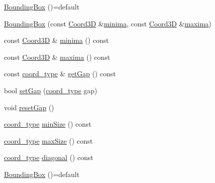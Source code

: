 \begin{DoxyCompactItemize}
\item 
\hyperlink{classMcCAD_1_1Geometry_1_1BoundingBox_aa9d7c831f4053d6eff0e2c484a2a0c92}{Bounding\+Box} ()=default
\item 
\hyperlink{classMcCAD_1_1Geometry_1_1BoundingBox_a7ed4eaad9315ad7414c2518ef49e2af5}{Bounding\+Box} (const \hyperlink{classMcCAD_1_1Geometry_1_1Coord3D}{Coord3D} \&\hyperlink{classMcCAD_1_1Geometry_1_1BoundingBox_a571f053b8fc4575dfe5857df084b6e19}{minima}, const \hyperlink{classMcCAD_1_1Geometry_1_1Coord3D}{Coord3D} \&\hyperlink{classMcCAD_1_1Geometry_1_1BoundingBox_abecf8327e0985ccbc63f167da3aaf763}{maxima})
\item 
const \hyperlink{classMcCAD_1_1Geometry_1_1Coord3D}{Coord3D} \& \hyperlink{classMcCAD_1_1Geometry_1_1BoundingBox_a571f053b8fc4575dfe5857df084b6e19}{minima} () const
\item 
const \hyperlink{classMcCAD_1_1Geometry_1_1Coord3D}{Coord3D} \& \hyperlink{classMcCAD_1_1Geometry_1_1BoundingBox_abecf8327e0985ccbc63f167da3aaf763}{maxima} () const
\item 
const \hyperlink{namespaceMcCAD_1_1Geometry_ac043b37a4a7e849fca22869e1982d2f8}{coord\+\_\+type} \& \hyperlink{classMcCAD_1_1Geometry_1_1BoundingBox_a9463a92bf72696016011e2bcd967b8de}{get\+Gap} () const
\item 
bool \hyperlink{classMcCAD_1_1Geometry_1_1BoundingBox_a78c149a7c7e7d6074a2b726a63c3c400}{set\+Gap} (\hyperlink{namespaceMcCAD_1_1Geometry_ac043b37a4a7e849fca22869e1982d2f8}{coord\+\_\+type} gap)
\item 
void \hyperlink{classMcCAD_1_1Geometry_1_1BoundingBox_abdedc7a259eca39fbfab2fa8fdd17a07}{reset\+Gap} ()
\item 
\hyperlink{namespaceMcCAD_1_1Geometry_ac043b37a4a7e849fca22869e1982d2f8}{coord\+\_\+type} \hyperlink{classMcCAD_1_1Geometry_1_1BoundingBox_af44f612439bea152e7d2a866a8f992ff}{min\+Size} () const
\item 
\hyperlink{namespaceMcCAD_1_1Geometry_ac043b37a4a7e849fca22869e1982d2f8}{coord\+\_\+type} \hyperlink{classMcCAD_1_1Geometry_1_1BoundingBox_a04ff6e5333ef4eabf48ab7db149caeea}{max\+Size} () const
\item 
\hyperlink{namespaceMcCAD_1_1Geometry_ac043b37a4a7e849fca22869e1982d2f8}{coord\+\_\+type} \hyperlink{classMcCAD_1_1Geometry_1_1BoundingBox_afe4d5ffa8973b4db685b7e50fbbd4cea}{diagonal} () const
\item 
\hyperlink{classMcCAD_1_1Geometry_1_1BoundingBox_aa9d7c831f4053d6eff0e2c484a2a0c92}{Bounding\+Box} ()=default

\end{DoxyCompactItemize}
